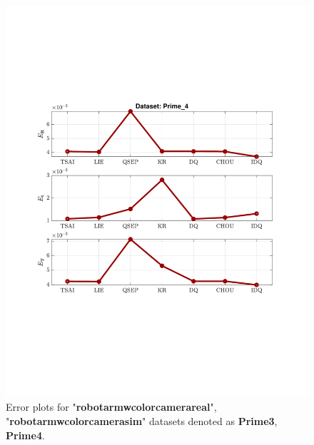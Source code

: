 \documentclass[a4paper]{report}
\begin{document}
\begin{figure}
\includegraphics[scale=0.7]{./hand_eye_figures/real/Result_Prime_4}
\caption{Error plots for "\textbf{robot{\textunderscore}arm{\textunderscore}w{\textunderscore}color{\textunderscore}camera{\textunderscore}real}", "\textbf{robot{\textunderscore}arm{\textunderscore}w{\textunderscore}color{\textunderscore}camera{\textunderscore}sim}" datasets denoted as \textbf{Prime{\textunderscore}3}, \textbf{Prime{\textunderscore}4}.}
\end{figure}
\end{document}
